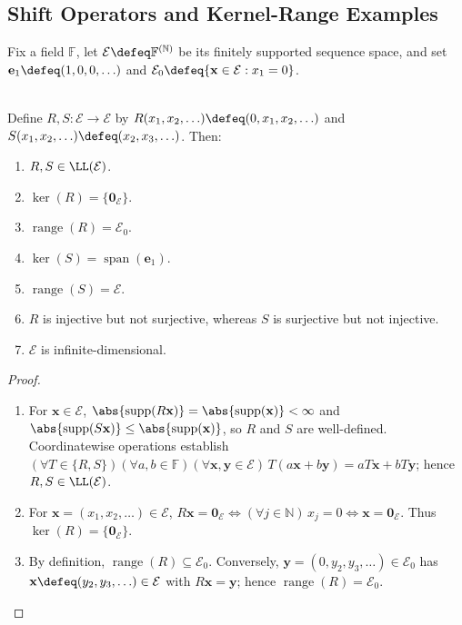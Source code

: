 \subsection{Shift Operators and Kernel-Range Examples}
Fix a field $\mathbb{F}$, let $\mathcal{E}\defeq\mathbb{F}^{(\mathbb{N})}$ be its finitely supported sequence space, and set $\mathbf{e}_1\defeq(1,0,0,\ldots)$ and $\mathcal{E}_0\defeq\{\mathbf{x}\in\mathcal{E}:x_1=0\}$.

\begin{proposition} \label{prop:shift-operators-finitely-nonzero} \\
Define $R,S:\mathcal{E}\to\mathcal{E}$ by $R(x_1,x_2,\ldots)\defeq(0,x_1,x_2,\ldots)$ and $S(x_1,x_2,\ldots)\defeq(x_2,x_3,\ldots)$. Then:
\begin{enumerate}[label=(\roman*)]
\setlength{\itemsep}{0pt}
\item $R,S\in\LL(\mathcal{E})$.
\item $\ker(R)=\{\mathbf{0}_{\mathcal{E}}\}$.
\item $\operatorname{range}(R)=\mathcal{E}_0$.
\item $\ker(S)=\operatorname{span}(\mathbf{e}_1)$.
\item $\operatorname{range}(S)=\mathcal{E}$.
\item $R$ is injective but not surjective, whereas $S$ is surjective but not injective.
\item $\mathcal{E}$ is infinite-dimensional.
\end{enumerate}
\begin{proof}
\begin{enumerate}[label=(\roman*)]
\setlength{\itemsep}{0pt}
\item For $\mathbf{x}\in\mathcal{E}$, $\abs{\operatorname{supp}(R\mathbf{x})}=\abs{\operatorname{supp}(\mathbf{x})}<\infty$ and $\abs{\operatorname{supp}(S\mathbf{x})}\leq\abs{\operatorname{supp}(\mathbf{x})}$, so $R$ and $S$ are well-defined.\\
Coordinatewise operations establish $(\forall T\in\{R,S\})(\forall a,b\in\mathbb{F})(\forall\mathbf{x},\mathbf{y}\in\mathcal{E})\,T(a\mathbf{x}+b\mathbf{y})=aT\mathbf{x}+bT\mathbf{y}$; hence $R,S\in\LL(\mathcal{E})$.
\item For $\mathbf{x}=(x_1,x_2,\ldots)\in\mathcal{E}$, $R\mathbf{x}=\mathbf{0}_{\mathcal{E}}\Longleftrightarrow(\forall j\in\mathbb{N})\,x_j=0\Longleftrightarrow\mathbf{x}=\mathbf{0}_{\mathcal{E}}$. Thus $\ker(R)=\{\mathbf{0}_{\mathcal{E}}\}$.
\item By definition, $\operatorname{range}(R)\subseteq\mathcal{E}_0$. Conversely, $\mathbf{y}=(0,y_2,y_3,\ldots)\in\mathcal{E}_0$ has $\mathbf{x}\defeq(y_2,y_3,\ldots)\in\mathcal{E}$ with $R\mathbf{x}=\mathbf{y}$; hence $\operatorname{range}(R)=\mathcal{E}_0$.

\end{enumerate}
\end{proof}
\end{proposition}
